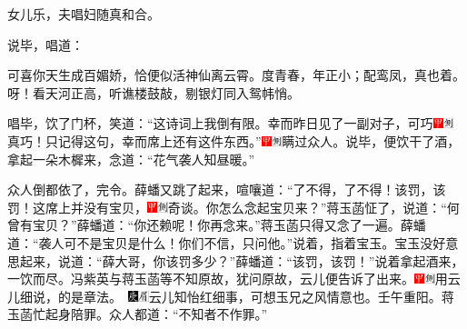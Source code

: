 女儿乐，夫唱妇随真和合。

说毕，唱道：

可喜你天生成百媚娇，恰便似活神仙离云霄。度青春，年正小；配鸾凤，真也着。呀！看天河正高，听谯楼鼓敲，剔银灯同入鸳帏悄。

唱毕，饮了门杯，笑道：“这诗词上我倒有限。幸而昨日见了一副对子，可巧{\includegraphics[width=3mm]{../Images/00002}\includegraphics[width=3mm]{../Images/00011}\footnotesize \kaishu 真巧！}只记得这句，幸而席上还有这件东西。”{\includegraphics[width=3mm]{../Images/00002}\includegraphics[width=3mm]{../Images/00011}\footnotesize \kaishu 瞒过众人。}说毕，便饮干了酒，拿起一朵木樨来，念道：“花气袭人知昼暖。”

众人倒都依了，完令。薛蟠又跳了起来，喧嚷道：“了不得，了不得！该罚，该罚！这席上并没有宝贝，{\includegraphics[width=3mm]{../Images/00002}\includegraphics[width=3mm]{../Images/00011}\footnotesize \kaishu 奇谈。}你怎么念起宝贝来？”蒋玉菡怔了，说道：“何曾有宝贝？”薛蟠道：“你还赖呢！你再念来。”蒋玉菡只得又念了一遍。薛蟠道：“袭人可不是宝贝是什么！你们不信，只问他。”说着，指着宝玉。宝玉没好意思起来，说道：“薛大哥，你该罚多少？”薛蟠道：“该罚，该罚！”说着拿起酒来，一饮而尽。冯紫英与蒋玉菡等不知原故，犹问原故，云儿便告诉了出来。{\includegraphics[width=3mm]{../Images/00002}\includegraphics[width=3mm]{../Images/00011}\footnotesize \kaishu 用云儿细说，的是章法。　\includegraphics[width=3mm]{../Images/00004}\includegraphics[width=3mm]{../Images/00010}\footnotesize \kaishu 云儿知怡红细事，可想玉兄之风情意也。壬午重阳。}蒋玉菡忙起身陪罪。众人都道：“不知者不作罪。”

